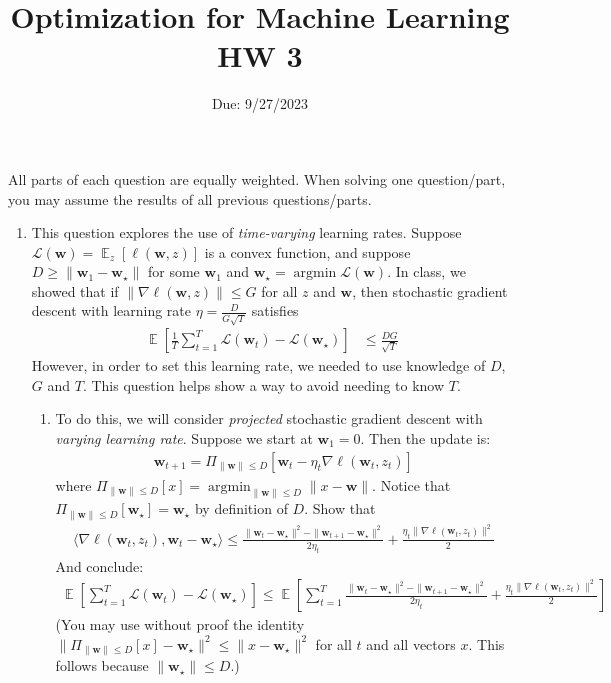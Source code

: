 \documentclass[letterpaper]{article}
\title{Optimization for Machine Learning HW 3}
\author{
}
\date{Due: 9/27/2023}
\newcommand{\E}{\mathop{\mathbb{E}}}
\newcommand{\argmin}{\mathop{\text{argmin}}}
\renewcommand{\L}{\mathcal{L}}
\newcommand{\bw}{\mathbf{w}}
\begin{document}
\maketitle
All parts of each question are equally weighted. When solving one question/part, you may assume the results of all previous questions/parts.
\begin{enumerate}

\item This question explores the use of \emph{time-varying} learning rates. Suppose $\L(\bw) = \E_z [\ell(\bw ,z)]$ is a convex function, and suppose $D\ge \|\bw_1-\bw_\star\|$ for some $\bw_1$ and $\bw_\star =\argmin \L(\bw)$. In class, we showed that if $\|\nabla \ell(\bw,z)\|\le G$ for all $z$ and $\bw$, then stochastic gradient descent with learning rate $\eta=\frac{D}{G\sqrt{T}}$ satisfies
\begin{align*}
    \E\left[\frac{1}{T}\sum_{t=1}^T \L(\bw_t) -\L(\bw_\star)\right]&\le \frac{DG}{\sqrt{T}}
\end{align*}
However, in order to set this learning rate, we needed to use knowledge of $D$, $G$ and $T$. This question helps show a way to avoid needing to know $T$.
\begin{enumerate}
    \item To do this, we will consider \emph{projected} stochastic gradient descent with \emph{varying learning rate}. Suppose we start at $\bw_1=0$. Then the update is:
    \begin{align*}
        \bw_{t+1} = \Pi_{\|\bw\|\le D} \left[\bw_t - \eta_t \nabla \ell(\bw_t,z_t)\right]
    \end{align*}
    where $\Pi_{\|\bw\|\le D}[x]=\argmin_{\|\bw\|\le D} \|x-\bw\|$. Notice that $\Pi_{\|\bw\|\le D}[\bw_\star]=\bw_\star$ by definition of $D$. Show that
    \begin{align*}
        \langle \nabla \ell(\bw_t,z_t),\bw_t-\bw_\star\rangle\le \frac{\|\bw_t-\bw_\star\|^2-\|\bw_{t+1}-\bw_\star\|^2}{2\eta_t} + \frac{\eta_t\|\nabla \ell(\bw_t,z_t)\|^2}{2}
    \end{align*}
    And conclude:
    \begin{align*}
        \E\left[\sum_{t=1}^T \L(\bw_t)-\L(\bw_\star)\right] \le \E\left[\sum_{t=1}^T \frac{\|\bw_t-\bw_\star\|^2-\|\bw_{t+1}-\bw_\star\|^2}{2\eta_t} + \frac{\eta_t\|\nabla \ell(\bw_t,z_t)\|^2}{2}\right]
    \end{align*}
    (You may use without proof the identity $\| \Pi_{\|\bw\|\le D}[x]-\bw_\star\|^2\le \|x-\bw_\star\|^2 $ for all $t$ and all vectors $x$. This follows because $\|\bw_\star\|\le D$.)
    

\end{enumerate}
\end{enumerate}
\end{document}
